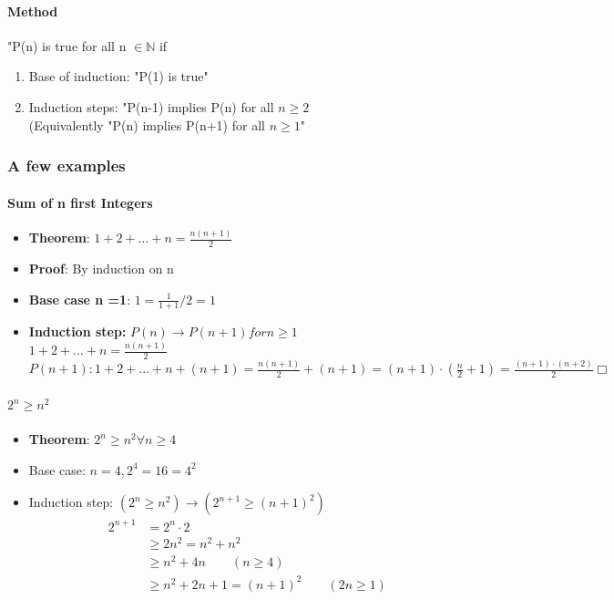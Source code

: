 \documentclass[9pt, letterpaper, oneside]{article}
\begin{document}
\paragraph{Method}
"P(n) is true for all n $\in \mathbb{N}$ if
\begin{enumerate}
	\item Base of induction: "P(1) is true"
	\item Induction steps: "P(n-1) implies P(n) for all $n \geq 2$ \\
	(Equivalently  "P(n) implies P(n+1) for all $n \geq 1$"
\end{enumerate}

\subsubsection{A few examples}

\paragraph{Sum of n first Integers}
\begin{itemize}
	\item \textbf{Theorem}: $1 + 2 + ... +n = \frac{n(n+1)}{2}$
	\item \textbf{Proof}: By induction on n
	\item \textbf{Base case n =1}: $1 = \frac{1}{1+1}/2 = 1$
	\item \textbf{Induction step:} $P(n) \to P(n+1) for n \geq 1$\\
			$1 + 2 + ... + n = \frac{n(n+1)}{2}$
			$P(n+1): 1 + 2 + ... +n + (n+1) = \frac{n(n+1)}{2} + (n + 1) = (n + 1) \cdot ( \frac{n}{2} + 1) = \frac{(n+1) \cdot (n + 2)}{2} \Box$
\end{itemize}

\paragraph{$2^n \geq n^2$}
\begin{itemize}
	\item \textbf{Theorem}: $2^n \geq n^2 \forall n \geq 4$
	\item Base case: $n = 4, 2^4 = 16 = 4^2$
	\item Induction step: $(2^n \geq n^2) \to (2^{n+1} \geq (n+1)^2)$
		\begin{align*}
		2^{n+1} &= 2^n \cdot 2 \\
		&\geq 2n^2 = n^2 + n^2 \\
		&\geq n^2 + 4n \qquad (n \geq 4) \\
		&\geq n^2 + 2n + 1 = (n + 1)^2 \qquad (2n \geq 1) \\
		\end{align*}
\end{itemize}
\end{document}

